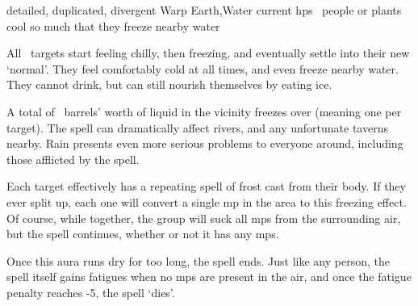   {detailed, duplicated, divergent}%
  {Warp}%
  {Earth,Water}%
  {current \glspl{hp}}%
  {\spellArea\ people or plants cool so much that they freeze nearby water}%
  {
    All \spellArea\ targets start feeling chilly, then freezing, and eventually settle into their new `normal'.
    They feel comfortably cold at all times, and even freeze nearby water.
    They cannot drink, but can still nourish themselves by eating ice.

    A total of \spellArea\ barrels' worth of liquid in the vicinity freezes over (meaning one per target).
    The spell can dramatically affect rivers, and any unfortunate taverns nearby.
    Rain presents even more serious problems to everyone around, including those afflicted by the spell.

    Each target effectively has a repeating spell of frost cast from their body.
    If they ever split up, each one will convert a single \gls{mp} in the area to this freezing effect.
    Of course, while together, the group will suck all \glspl{mp} from the surrounding air, but the spell continues, whether or not it has any \glspl{mp}.

    Once this aura runs dry for too long, the spell ends.
    Just like any person, the spell itself gains \glspl{fatigue} when no \glspl{mp} are present in the air, and once the \gls{fatigue} penalty reaches -5, the spell `dies'.
  }

